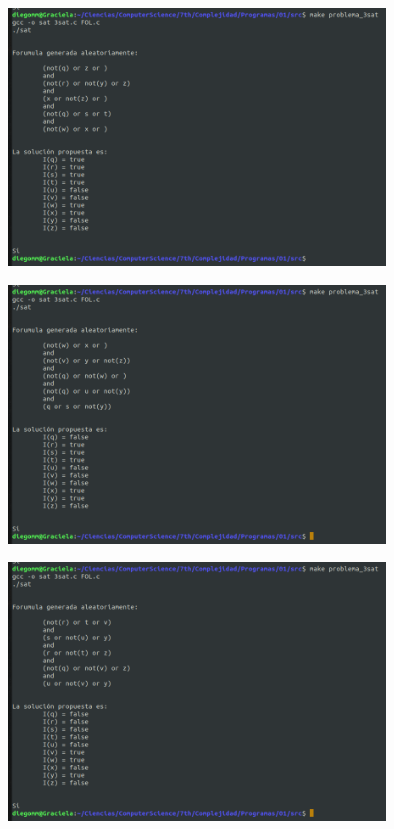 \documentclass[14pt,letterpaper]{article}
\begin{document}
\begin{itemize}
\begin{enumerate}
    \begin{figure}[h]
      \includegraphics[width=10cm]{sat_2.png}
      \centering
    \end{figure}

    \hfill\break
    
    \begin{figure}[h]
      \includegraphics[width=10cm]{sat_3.png}
      \centering
    \end{figure}

    \hfill\break
    
    \begin{figure}[h]
      \includegraphics[width=10cm]{sat_4.png}
      \centering
    \end{figure}


\end{enumerate}
\end{itemize}
\end{document}
